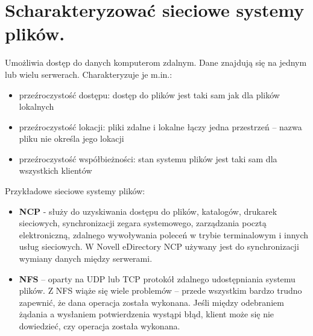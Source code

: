 \documentclass[12pt,a4paper]{article}
\begin{document}
	\section{Scharakteryzować sieciowe systemy plików.}
	\label{sec:siecsysplik}
	Umożliwia dostęp do danych komputerom zdalnym. Dane znajdują się na jednym lub wielu serwerach. Charakteryzuje je m.in.:
	\begin{itemize}
		\item przeźroczystość dostępu: dostęp do plików jest taki sam jak dla plików lokalnych
		\item przeźroczystość lokacji: pliki zdalne i lokalne łączy jedna przestrzeń -- nazwa pliku nie określa jego lokacji
		\item przeźroczystość współbieżności: stan systemu plików jest taki sam dla wszystkich klientów
	\end{itemize}

	Przykładowe sieciowe systemy plików:
	\begin{itemize}
		\item \textbf{NCP} - służy do uzyskiwania dostępu do plików, katalogów, drukarek sieciowych, synchronizacji zegara systemowego, zarządzania pocztą elektroniczną, zdalnego wywoływania poleceń w trybie terminalowym i innych usług sieciowych. W Novell eDirectory NCP używany jest do synchronizacji wymiany danych między serwerami.
		\item \textbf{NFS} – oparty na UDP lub TCP protokół zdalnego udostępniania systemu plików. Z NFS wiąże się wiele problemów – przede wszystkim bardzo trudno zapewnić, że dana operacja została wykonana. Jeśli między odebraniem żądania a wysłaniem potwierdzenia wystąpi błąd, klient może się nie dowiedzieć, czy operacja została wykonana.
	\end{itemize}
\end{document}
